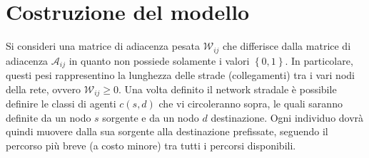 \documentclass[../main.tex]{subfiles}
\begin{document}
\section{Costruzione del modello}
Si consideri una matrice di adiacenza pesata $\mathcal{W}_{ij}$ che differisce dalla matrice di adiacenza $\mathcal{A}_{ij}$ in quanto non possiede solamente i valori $\left\{0,1\right\}$.
In particolare, questi pesi rappresentino la lunghezza delle strade (collegamenti) tra i vari nodi della rete, ovvero $\mathcal{W}_{ij} \geq 0$.
Una volta definito il network stradale \`e possibile definire le classi di agenti $c(s,d)$ che vi circoleranno sopra, le quali saranno definite da un nodo $s$ sorgente e da un nodo $d$ destinazione.
Ogni individuo dovrà quindi muovere dalla sua sorgente alla destinazione prefissate, seguendo il percorso pi\`u breve (a costo minore) tra tutti i percorsi disponibili.
\end{document}

